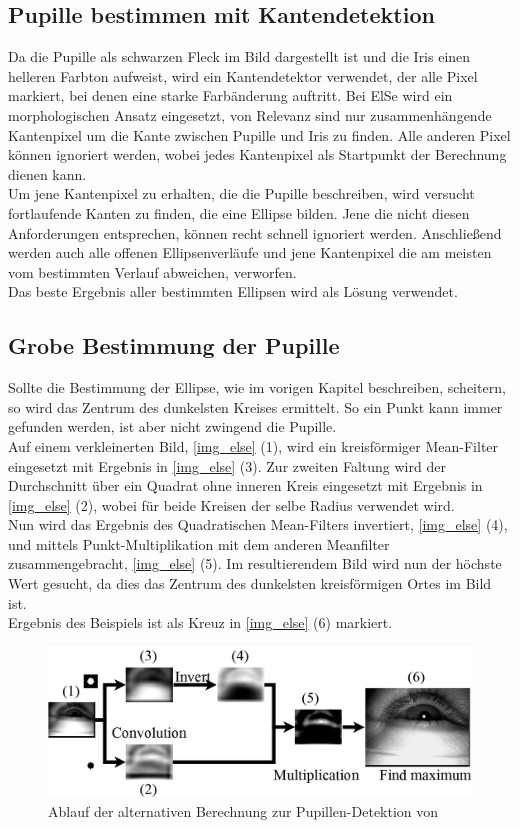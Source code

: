 \subsection{Pupille bestimmen mit Kantendetektion}
Da die Pupille als schwarzen Fleck im Bild dargestellt ist und die Iris einen helleren Farbton aufweist, wird ein Kantendetektor verwendet, der alle Pixel markiert, bei denen eine starke Farbänderung auftritt. Bei ElSe wird ein morphologischen Ansatz eingesetzt, von Relevanz sind nur zusammenhängende Kantenpixel um die Kante zwischen Pupille und Iris zu finden. Alle anderen Pixel können ignoriert werden, wobei jedes Kantenpixel als Startpunkt der Berechnung dienen kann.\\
Um jene Kantenpixel zu erhalten, die die Pupille beschreiben, wird versucht fortlaufende Kanten zu finden, die eine Ellipse bilden. Jene die nicht diesen Anforderungen entsprechen, können recht schnell ignoriert werden. Anschließend werden auch alle offenen Ellipsenverläufe und jene Kantenpixel die am meisten vom bestimmten Verlauf abweichen, verworfen.\\
Das beste Ergebnis aller bestimmten Ellipsen wird als Lösung verwendet.
\subsection{Grobe Bestimmung der Pupille}
\label{ElSe_Grob}
Sollte die Bestimmung der Ellipse, wie im vorigen Kapitel beschreiben, scheitern, so wird das Zentrum des dunkelsten Kreises ermittelt. So ein Punkt kann immer gefunden werden, ist aber nicht zwingend die Pupille.\\
Auf einem verkleinerten Bild, \autoref{img_else} (1), wird ein kreisförmiger Mean-Filter eingesetzt mit Ergebnis in \autoref{img_else} (3). Zur zweiten Faltung wird der Durchschnitt über ein Quadrat ohne inneren Kreis eingesetzt mit Ergebnis in \autoref{img_else} (2), wobei für beide Kreisen der selbe Radius verwendet wird.\\
Nun wird das Ergebnis des Quadratischen Mean-Filters invertiert, \autoref{img_else} (4), und mittels Punkt-Multiplikation mit dem anderen Meanfilter zusammengebracht, \autoref{img_else} (5). Im resultierendem Bild wird nun der höchste Wert gesucht, da dies das Zentrum des dunkelsten kreisförmigen Ortes im Bild ist.\\
Ergebnis des Beispiels ist als Kreuz in \autoref{img_else} (6) markiert. 
\begin{figure}
	\centering
	\includegraphics[width=0.8\linewidth]{img/ElSe}
	\caption{Ablauf der alternativen Berechnung zur Pupillen-Detektion von \cite{ElSe}}
	\label{img_else}
\end{figure}